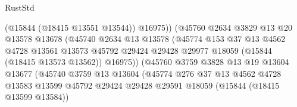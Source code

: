 \begin{lexlean}{RustStd}
\begin{coremodule}
                                        (@15844 (@18415 @13551 @13544))
                                        @16975))
                                    (@45760
                                      @2634
                                      @3829
                                      @13
                                      @20
                                      @13578
                                      @13678
                                      (@45740
                                        @2634
                                        @13
                                        @13578
                                        (@45774
                                          @153
                                          @37
                                          @13
                                          @4562
                                          @4728
                                          @13561
                                          @13573
                                          @45792
                                          @29424
                                          @29428
                                          @29977
                                          @18059
                                          (@15844 (@18415 @13573 @13562))
                                          @16975))
                                      (@45760
                                        @3759
                                        @3828
                                        @13
                                        @19
                                        @13604
                                        @13677
                                        (@45740
                                          @3759
                                          @13
                                          @13604
                                          (@45774
                                            @276
                                            @37
                                            @13
                                            @4562
                                            @4728
                                            @13583
                                            @13599
                                            @45792
                                            @29424
                                            @29428
                                            @29591
                                            @18059
                                            (@15844 (@18415 @13599 @13584))

\end{coremodule}
\end{lexlean}
